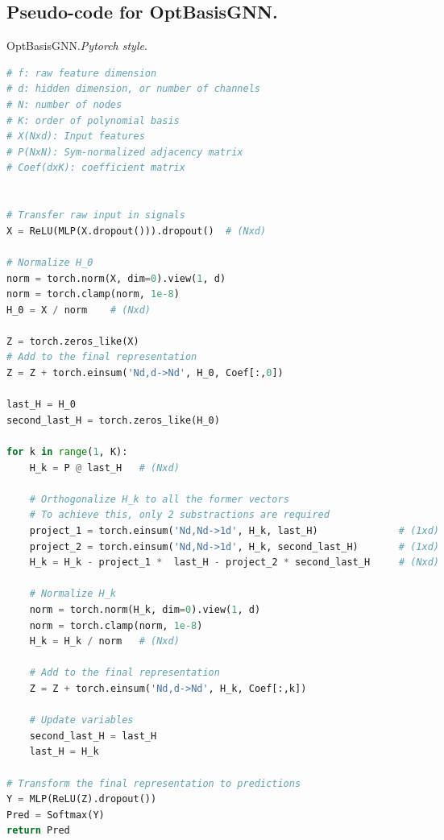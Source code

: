 \subsection{Pseudo-code for OptBasisGNN.}
\label{sec:pseudo_torch_OptBasis}


\begin{algorithm}[H]
\caption{OptBasisGNN.\textit{Pytorch style}.}
\label{alg:cotextde}

\begin{lstlisting}[language=python]
# f: raw feature dimension
# d: hidden dimension, or number of channels
# N: number of nodes
# K: order of polynomial basis
# X(Nxd): Input features 
# P(NxN): Sym-normalized adjacency matrix 
# Coef(dxK): coefficient matrix


# Transfer raw input in signals 
X = ReLU(MLP(X.dropout())).dropout()  # (Nxd)

# Normalize H_0
norm = torch.norm(X, dim=0).view(1, d)
norm = torch.clamp(norm, 1e-8)
H_0 = X / norm    # (Nxd)

Z = torch.zeros_like(X)
# Add to the final representation
Z = Z + torch.einsum('Nd,d->Nd', H_0, Coef[:,0])  

last_H = H_0
second_last_H = torch.zeros_like(H_0)

for k in range(1, K):
    H_k = P @ last_H   # (Nxd)

    # Orthogonalize H_k to all the former vectors
    # To achieve this, only 2 substractions are required
    project_1 = torch.einsum('Nd,Nd->1d', H_k, last_H)              # (1xd)
    project_2 = torch.einsum('Nd,Nd->1d', H_k, second_last_H)       # (1xd)
    H_k = H_k - project_1 *  last_H - project_2 * second_last_H     # (Nxd)

    # Normalize H_k
    norm = torch.norm(H_k, dim=0).view(1, d)
    norm = torch.clamp(norm, 1e-8)
    H_k = H_k / norm   # (Nxd)

    # Add to the final representation
    Z = Z + torch.einsum('Nd,d->Nd', H_k, Coef[:,k])

    # Update variables
    second_last_H = last_H
    last_H = H_k

# Transform the final representation to predictions
Y = MLP(ReLU(Z).dropout())
Pred = Softmax(Y)
return Pred
\end{lstlisting}
\end{algorithm} 
